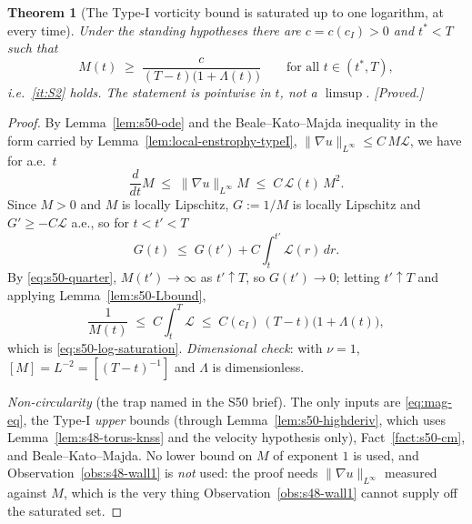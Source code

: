 \documentclass[11pt]{article}
\newtheorem{theorem}{Theorem}[section]
\theoremstyle{definition}
\theoremstyle{remark}
\begin{document}
\begin{theorem}[The Type-I vorticity bound is saturated up to one logarithm,
  at every time]\label{thm:s50-log-saturation}
  Under the standing hypotheses there are $c=c(c_I)>0$ and $t^*<T$ such that
  \begin{equation}\label{eq:s50-log-saturation}
    M(t) \;\geq\; \frac{c}{(T-t)\bigl(1+\Lambda(t)\bigr)}
    \qquad\text{for all } t\in(t^*,T),
  \end{equation}
  i.e.\ \ref{it:S2} holds. The statement is pointwise in $t$, not a
  $\limsup$. \emph{[Proved.]}
\end{theorem}
\begin{proof}
  By Lemma~\ref{lem:s50-ode} and the Beale--Kato--Majda inequality in the form
  carried by Lemma~\ref{lem:local-enstrophy-typeI},
  $\|\nabla u\|_{L^\infty}\leq C\,M\mathcal{L}$, we have for a.e.\ $t$
  \[
    \frac{d}{dt}M \;\leq\; \|\nabla u\|_{L^\infty}M
      \;\leq\; C\,\mathcal{L}(t)\,M^2 .
  \]
  Since $M>0$ and $M$ is locally Lipschitz, $G:=1/M$ is locally Lipschitz and
  $G'\geq-C\mathcal{L}$ a.e., so for $t<t'<T$
  \[
    G(t) \;\leq\; G(t') + C\int_t^{t'}\mathcal{L}(r)\,dr .
  \]
  By \eqref{eq:s50-quarter}, $M(t')\to\infty$ as $t'\uparrow T$, so
  $G(t')\to0$; letting $t'\uparrow T$ and applying
  Lemma~\ref{lem:s50-Lbound},
  \[
    \frac1{M(t)} \;\leq\; C\int_t^T\mathcal{L}
      \;\leq\; C(c_I)\,(T-t)\bigl(1+\Lambda(t)\bigr),
  \]
  which is \eqref{eq:s50-log-saturation}. \emph{Dimensional check}: with
  $\nu=1$, $[M]=L^{-2}=[(T-t)^{-1}]$ and $\Lambda$ is dimensionless.

  \emph{Non-circularity} (the trap named in the S50 brief). The only inputs
  are \eqref{eq:mag-eq}, the Type-I \emph{upper} bounds (through
  Lemma~\ref{lem:s50-highderiv}, which uses
  Lemma~\ref{lem:s48-torus-knss} and the velocity hypothesis only),
  Fact~\ref{fact:s50-cm}, and Beale--Kato--Majda. No lower bound on $M$ of
  exponent $1$ is used, and Observation~\ref{obs:s48-wall1} is \emph{not}
  used: the proof needs $\|\nabla u\|_{L^\infty}$ measured against $M$, which
  is the very thing Observation~\ref{obs:s48-wall1} cannot supply off the
  saturated set.
\end{proof}
\end{document}
